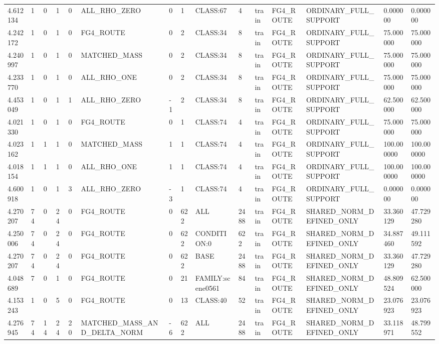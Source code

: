\begin{tabular}{lllllllllllllll}
4.612134 & 1 & 0 & 1 & 0 & ALL\_RHO\_ZERO & 0 & 1 & CLASS:67 & 4 & train & FG4\_ROUTE & ORDINARY\_FULL\_SUPPORT & 0.000000 & 0.000000 \\
4.242172 & 1 & 0 & 1 & 0 & FG4\_ROUTE & 0 & 2 & CLASS:34 & 8 & train & FG4\_ROUTE & ORDINARY\_FULL\_SUPPORT & 75.000000 & 75.000000 \\
4.240997 & 1 & 0 & 1 & 0 & MATCHED\_MASS & 0 & 2 & CLASS:34 & 8 & train & FG4\_ROUTE & ORDINARY\_FULL\_SUPPORT & 75.000000 & 75.000000 \\
4.233770 & 1 & 0 & 1 & 0 & ALL\_RHO\_ONE & 0 & 2 & CLASS:34 & 8 & train & FG4\_ROUTE & ORDINARY\_FULL\_SUPPORT & 75.000000 & 75.000000 \\
4.453049 & 1 & 0 & 1 & 1 & ALL\_RHO\_ZERO & -1 & 2 & CLASS:34 & 8 & train & FG4\_ROUTE & ORDINARY\_FULL\_SUPPORT & 62.500000 & 62.500000 \\
4.021330 & 1 & 0 & 1 & 0 & FG4\_ROUTE & 0 & 1 & CLASS:74 & 4 & train & FG4\_ROUTE & ORDINARY\_FULL\_SUPPORT & 75.000000 & 75.000000 \\
4.023162 & 1 & 1 & 1 & 0 & MATCHED\_MASS & 1 & 1 & CLASS:74 & 4 & train & FG4\_ROUTE & ORDINARY\_FULL\_SUPPORT & 100.000000 & 100.000000 \\
4.018154 & 1 & 1 & 1 & 0 & ALL\_RHO\_ONE & 1 & 1 & CLASS:74 & 4 & train & FG4\_ROUTE & ORDINARY\_FULL\_SUPPORT & 100.000000 & 100.000000 \\
4.600918 & 1 & 0 & 1 & 3 & ALL\_RHO\_ZERO & -3 & 1 & CLASS:74 & 4 & train & FG4\_ROUTE & ORDINARY\_FULL\_SUPPORT & 0.000000 & 0.000000 \\
4.270207 & 74 & 0 & 24 & 0 & FG4\_ROUTE & 0 & 622 & ALL & 2488 & train & FG4\_ROUTE & SHARED\_NORM\_DEFINED\_ONLY & 33.360129 & 47.729280 \\
4.250006 & 74 & 0 & 24 & 0 & FG4\_ROUTE & 0 & 622 & CONDITION:0 & 622 & train & FG4\_ROUTE & SHARED\_NORM\_DEFINED\_ONLY & 34.887460 & 49.111592 \\
4.270207 & 74 & 0 & 24 & 0 & FG4\_ROUTE & 0 & 622 & BASE & 2488 & train & FG4\_ROUTE & SHARED\_NORM\_DEFINED\_ONLY & 33.360129 & 47.729280 \\
4.048689 & 7 & 0 & 1 & 0 & FG4\_ROUTE & 0 & 21 & FAMILY:scene0561 & 84 & train & FG4\_ROUTE & SHARED\_NORM\_DEFINED\_ONLY & 48.809524 & 62.500000 \\
4.153243 & 1 & 0 & 5 & 0 & FG4\_ROUTE & 0 & 13 & CLASS:40 & 52 & train & FG4\_ROUTE & SHARED\_NORM\_DEFINED\_ONLY & 23.076923 & 23.076923 \\
4.276945 & 74 & 14 & 24 & 20 & MATCHED\_MASS\_AND\_DELTA\_NORM & -6 & 622 & ALL & 2488 & train & FG4\_ROUTE & SHARED\_NORM\_DEFINED\_ONLY & 33.118971 & 48.799552 \\

\end{tabular}
